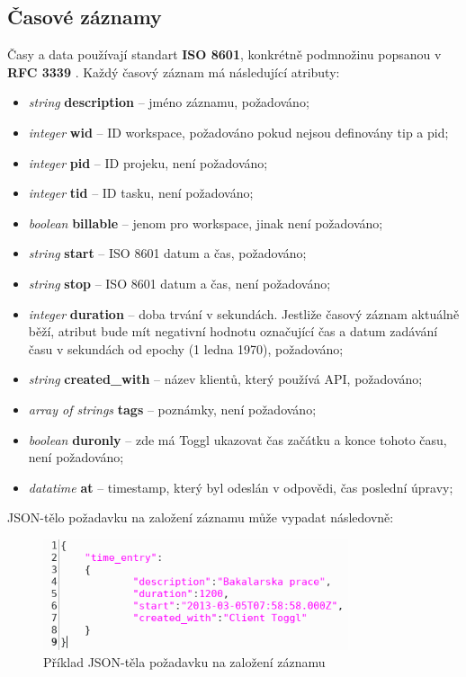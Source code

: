 \documentclass[thesis=B,czech]{FITthesis}[2012/06/26]
\begin{document}
\subsection{Časové záznamy} 
	Časy a data používají standart \textbf{ISO 8601}, konkrétně podmnožinu popsanou v \textbf{RFC 3339} \cite{dates}.
	Každý časový záznam \cite{toggl_api_en} má následující atributy: 
	\begin{itemize}
		\item \textit{string} \textbf{description} -- jméno záznamu, požadováno;
		\item \textit{integer} \textbf{wid} -- ID workspace, požadováno pokud nejsou definovány tip a pid;
		\item \textit{integer} \textbf{pid} -- ID projeku, není požadováno;
		\item \textit{integer} \textbf{tid} -- ID tasku, není požadováno;
		\item \textit{boolean} \textbf{billable} -- jenom pro workspace, jinak není požadováno;
		\item \textit{string} \textbf{start} -- ISO 8601 datum a čas, požadováno;
		\item \textit{string} \textbf{stop} -- ISO 8601 datum a čas, není požadováno;
		\item \textit{integer} \textbf{duration} -- doba trvání v sekundách. Jestliže časový záznam aktuálně běží, atribut bude mít negativní hodnotu označující čas a datum zadávání času v sekundách od epochy (1 ledna 1970), požadováno;
		\item \textit{string} \textbf{created\_with} -- název klientů, který používá API, požadováno;
		\item \textit{array of strings} \textbf{tags} -- poznámky, není požadováno;
		\item \textit{boolean} \textbf{duronly} -- zde má Toggl ukazovat čas začátku a konce tohoto času, není požadováno;
		\item \textit{datatime} \textbf{at} -- timestamp, který byl odeslán v odpovědi, čas poslední úpravy;
	\end{itemize}

JSON-tělo požadavku na založení záznamu může vypadat následovně: 
 \begin{figure}[h]\centering
	\includegraphics[width=0.8\textwidth]{json_body.png}
	\caption[Příklad JSON-těla požadavku na založení záznamu]{Příklad JSON-těla požadavku na založení záznamu}\label{fig:json_body}
\end{figure}
\end{document}

